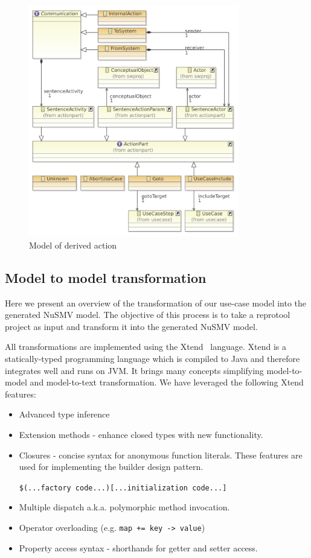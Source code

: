 \begin{figure}[ht]
  \centering
  \includegraphics[width=260pt]{images/ReprotoolActionsModel}
  \caption{Model of derived action}
  \label{fig:ReprotoolActionsModel_}
\end{figure}

\subsection{Model to model transformation}

Here we present an overview of the transformation of our use-case model into the generated NuSMV model. The objective of this process is to take a reprotool project as input and transform it into the generated NuSMV model.

All transformations are implemented using the Xtend~\cite{Xtend-website} language.
Xtend is a statically-typed programming language which is compiled to Java and therefore integrates well and runs on JVM. It brings many concepts simplifying model-to-model and model-to-text transformation. We have leveraged the following Xtend features: 
\begin{itemize}
	\item Advanced type inference
	\item Extension methods - enhance closed types with new functionality.
	\item Closures - concise syntax for anonymous function literals.
		These features are used for implementing the builder design pattern.
	
		\verb|$(...factory code...)[...initialization code...]|
	
	\item Multiple dispatch a.k.a. polymorphic method invocation.
	\item Operator overloading (e.g. \verb|map += key -> value|)
	\item Property access syntax - shorthands for getter and setter access.
\end{itemize}

